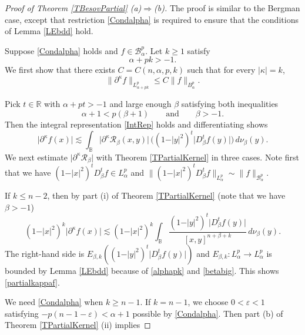 \documentclass{amsart}
\theoremstyle{definition}
\theoremstyle{remark}
\begin{document}
\begin{proof}[Proof of Theorem \ref{TBesovPartial} (a)$\Rightarrow$(b)]
The proof is similar to the Bergman case, except that
restriction \eqref{Condalpha} is required to ensure that the conditions
of Lemma \ref{LEbdd} hold.

Suppose \eqref{Condalpha} holds and $f\in\mathcal B^p_\alpha$.
Let $k\ge 1$ satisfy
\begin{equation}\label{alphapk}
\alpha+pk>-1.
\end{equation}
We first show that there exists $C=C(n,\alpha,p,k)$ such that for every
$\vert\kappa\vert=k$,
\begin{equation}\label{partialkappaf}
\|\partial^\kappa f\|_{L^p_{\alpha+pk}}\le C\|f\|_{B^p_\alpha}.
\end{equation}

Pick $t\in\mathbb R$ with $\alpha+pt>-1$ and large enough
$\beta$ satisfying both inequalities
\begin{equation}\label{betabig}
\alpha+1<p(\beta+1)
\qquad \text{and}
\qquad \beta>-1.
\end{equation}
Then the integral representation \eqref{IntRep} holds and differentiating shows
\begin{equation}\label{partialfsmall}
\vert\partial^\kappa f(x)\vert
\lesssim\int_{\mathbb B} \vert\partial^\kappa\mathcal R_\beta(x,y)\vert\,
\bigl((1-\vert y\vert^2)^t \vert D^t_\beta f(y)\vert\bigr)\,d\nu_\beta(y).
\end{equation}
We next estimate $\vert\partial^\kappa\mathcal R_\beta\vert$ with
Theorem \ref{TPartialKernel} in three cases.
Note first that we have $(1-\vert x\vert^2)^t D^t_\beta f\in L^p_\alpha$ and
$\|(1-\vert x\vert^2)^t D^t_\beta f\|_{L^p_\alpha}\sim\|f\|_{\mathcal B^p_\alpha}$.

If $k\le n-2$, then by part (i) of Theorem \ref{TPartialKernel} (note that
we have $\beta>-1$)
\begin{equation*}
(1-\vert x\vert^2)^k\vert\partial^\kappa f(x)\vert
\lesssim (1-\vert x\vert^2)^k\int_{\mathbb B}
\frac{(1-\vert y\vert^2)^t \vert D^t_\beta f(y)\vert}{[x,y]^{n+\beta+k}}
\,d\nu_\beta(y).
\end{equation*}
The right-hand side is $E_{\beta,k}((1-\vert y\vert^2)^t \vert D^t_\beta f(y)\vert)$
and $E_{\beta,k}\colon L^p_\alpha\to L^p_\alpha$ is bounded by Lemma \ref{LEbdd}
because of \eqref{alphapk} and \eqref{betabig}.
This shows \eqref{partialkappaf}.

We need \eqref{Condalpha} when $k\ge n-1$.
If $k=n-1$, we choose $0<\varepsilon<1$ satisfying $-p(n-1-\varepsilon)<\alpha+1$
possible by \eqref{Condalpha}.
Then part (b) of Theorem \ref{TPartialKernel} (ii) implies


\end{proof}
\end{document}
